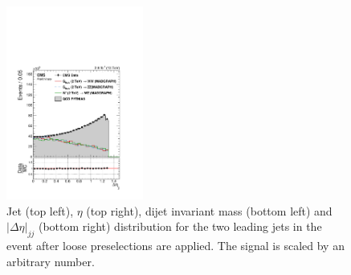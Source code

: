 \begin{figure}[h!]
\includegraphics[width=0.4\textwidth]{figures/analysis/search1/AN-15-211/controlplots/silverjson/DeltaEta_WSignal.pdf}
\caption{Jet \PT (top left), $\eta$ (top right), dijet invariant mass (bottom left) and $|\Delta \eta|_{jj}$ (bottom right) distribution for the two leading jets in the event after loose preselections are applied. The signal is scaled by an arbitrary number.}
\label{fig:kinematics-all}
\end{figure}

